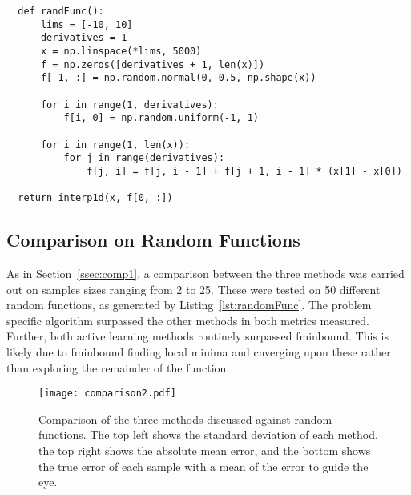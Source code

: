 \lstset{language=Python}
\lstset{frame=lines}
\lstset{basicstyle=\footnotesize}
\begin{lstlisting}
  def randFunc():
      lims = [-10, 10]
      derivatives = 1
      x = np.linspace(*lims, 5000)
      f = np.zeros([derivatives + 1, len(x)])
      f[-1, :] = np.random.normal(0, 0.5, np.shape(x))

      for i in range(1, derivatives):
          f[i, 0] = np.random.uniform(-1, 1)

      for i in range(1, len(x)):
          for j in range(derivatives):
              f[j, i] = f[j, i - 1] + f[j + 1, i - 1] * (x[1] - x[0])

  return interp1d(x, f[0, :])

\end{lstlisting}

\subsection{Comparison on Random Functions}
As in Section~\ref{ssec:comp1}, a comparison between the three methods was carried out on samples sizes ranging from 2 to 25. These were tested on 50 different random functions, as generated by Listing~\ref{lst:randomFunc}. The problem specific algorithm surpassed the other methods in both metrics measured. Further, both active learning methods routinely surpassed fminbound. This is likely due to fminbound finding local minima and cnverging upon these rather than exploring the remainder of the function.

\begin{figure}[htbp!] 
  \centering    
  \texttt{[image: comparison2.pdf]}
  \caption[Rigorous Comparison]{Comparison of the three methods discussed against random functions. The top left shows the standard deviation of each method, the top right shows the absolute mean error, and the bottom shows the true error of each sample with a mean of the error to guide the eye.}
  \label{fig:betterComparison}
\end{figure}